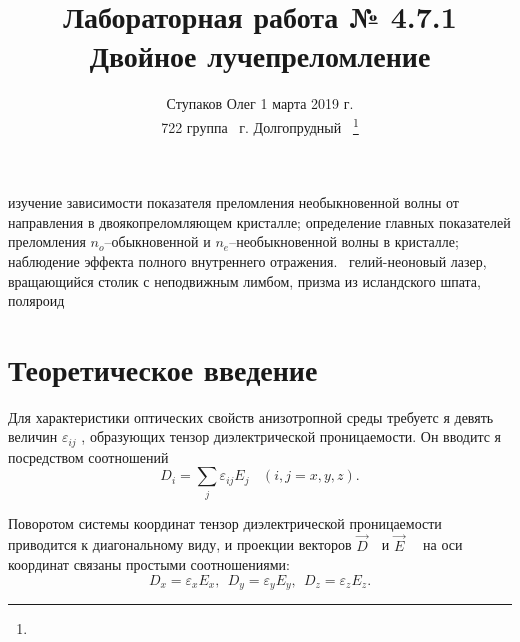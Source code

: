 \documentclass[journal, a4paper]{IEEEtran}
\begin{document}
	\title{{\large Лабораторная работа № 4.7.1}\\Двойное лучепреломление
}
	\author{Ступаков Олег \hspace{11.62cm} 1 марта 2019 г. \\ 722 группа 
	\hspace{11.71cm} ~г. Долгопрудный~
	\thanks{}}
	\maketitle



\section*{}
	 изучение зависимости показателя преломления
необыкновенной волны от направления в двоякопреломляющем кристалле; определение главных показателей преломления $n_o$--обыкновенной и $n_{e}$--необыкновенной волны в кристалле; наблюдение эффекта полного внутреннего отражения.\vspace{0.15cm}
	~гелий-неоновый лазер, вращающийся столик с неподвижным лимбом, призма из исландского шпата, поляроид
\section{Теоретическое введение}
 Для
характеристики оптических свойств анизотропной среды требуетс
я девять величин $\varepsilon_{ij}$ , образующих тензор диэлектрической проницаемости. Он вводитс
я посредством соотношений
	\begin{equation}\label{}
	D_i =\sum_{j}\varepsilon_{ij}E_j ~~~~(i,j= x,y,z). 
	\end{equation}
	
	Поворотом системы координат тензор диэлектрической проницаемости приводится к диагональному виду, и проекции векторов
 $\vec D\quad $и
$\vec E\quad$ на оси
координат связаны
простыми соотношениями:
\[D_x = \varepsilon_xE_x,~~ D_y = \varepsilon_yE_y,~~ D_z = \varepsilon_zE_z.\]
\end{document}

